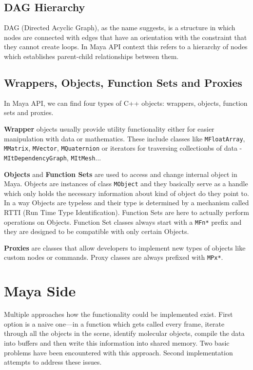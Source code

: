 \documentclass[
  digital, %
  table,   %
  nolof,     %
  nolot,     %
]{fithesis3}
\begin{document}
\subsection{DAG Hierarchy}
DAG (Directed Acyclic Graph), as the name suggests, is a structure in which nodes are connected with edges that have an orientation with the constraint that they cannot create loops. In Maya API context this refers to a hierarchy of nodes which establishes parent-child relationships between them.

\subsection{Wrappers, Objects, Function Sets and Proxies}
In Maya API, we can find four types of C++ objects: wrappers, objects, function sets and proxies.

\textbf{Wrapper} objects usually provide utility functionality either for easier manipulation with data or mathematics. These include classes like \texttt{MFloatArray}, \texttt{MMatrix}, \texttt{MVector}, \texttt{MQuaternion} or iterators for traversing collectionbs of data - \texttt{MItDependencyGraph}, \texttt{MItMesh}...

\textbf{Objects} and \textbf{Function Sets} are used to access and change internal object in Maya. Objects are instances of class \texttt{MObject} and they basically serve as a handle which only holds the necessary information about kind of object do they point to. In a way Objects are typeless and their type is determined by a mechanism called RTTI (Run Time Type Identification). Function Sets are here to actually perform operations on Objects. Function Set classes always start with a \texttt{MFn*} prefix and they are designed to be compatible with only certain Objects.

\textbf{Proxies} are classes that allow developers to implement new types of objects like custom nodes or commands. Proxy classes are always prefixed with \texttt{MPx*}.

\section{Maya Side}
Multiple approaches how the functionality could be implemented exist. First option is a naive one—in a function which gets called every frame, iterate through all the objects in the scene, identify molecular objects, compile the data into buffers and then write this information into shared memory. Two basic problems have been encountered with this approach. Second implementation attempts to address these issues.
\end{document}

